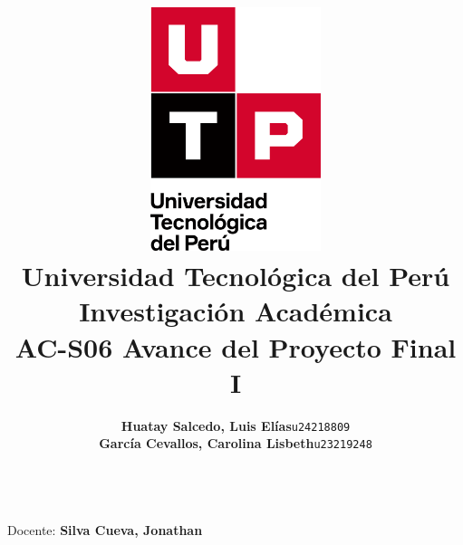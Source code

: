 \documentclass{article}
\title{
  \pagenumbering{gobble}
  \vspace{1cm}
  \includegraphics[width=5cm,clip,trim=0cm 2.9cm 0cm 0cm]{./assets/isotipo-utp.png} \\
  \vspace{0.5cm}
  \textbf{Universidad Tecnológica del Perú} \\
  \vspace{0.5cm}
  \textbf{Investigación Académica} \\
  \vspace{1cm}
    {\huge \textbf{AC-S06 Avance del Proyecto Final I}} \\
  \vspace{1cm}
}
\author{
  \begin{tabular}{l r}
    \textbf{Huatay Salcedo, Luis Elías} & \texttt{u24218809} \\
    \textbf{García Cevallos, Carolina Lisbeth} & \texttt{u23219248} \\
  \end{tabular} \\
}
\begin{document}
\maketitle
\begin{center}
  Docente: \textbf{Silva Cueva, Jonathan} \\
\end{center}

%
%

\newpage



\newpage
\setcounter{page}{1}  





\printbibliography
\end{document}
